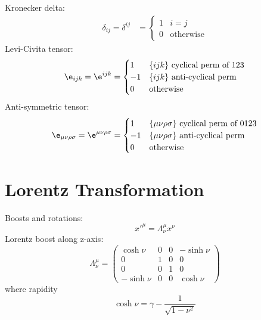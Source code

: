 \documentclass[a4paper, 11pt, normalem]{report}
\begin{document}
Kronecker delta:
\begin{align}
    \delta_{ij} = \delta^{ij} &= \begin{cases} 1 & i=j \\ 0 & \text{otherwise} \end{cases}
\end{align}
Levi-Civita tensor:
\begin{equation}
    \e_{ijk} = \e^{ijk} = \begin{cases} 1 & \{ijk\} \text{ cyclical perm of 123} \\ -1 & \{ijk\} \text{ anti-cyclical perm} \\ 0 & \text{otherwise} \end{cases}
\end{equation}
Anti-symmetric tensor:
\begin{equation}
    \e_{\mu\nu\rho\sigma} = \e^{\mu\nu\rho\sigma} = \begin{cases} 1 & \{\mu\nu\rho\sigma\} \text{ cyclical perm of 0123} \\ -1 & \{\mu\nu\rho\sigma\} \text{ anti-cyclical perm} \\ 0 & \text{otherwise} \end{cases}
\end{equation}

\section{Lorentz Transformation}
Boosts and rotations:
\begin{equation}
    x'^\mu = \Lambda^\mu_\nu x^\nu
\end{equation}
Lorentz boost along z-axis:
\begin{equation}
    \Lambda^\mu_\nu = \begin{pmatrix} \cosh\nu & 0 & 0 & -\sinh\nu \\ 0 & 1 & 0 & 0 \\ 0 & 0 & 1 & 0 \\ -\sinh\nu & 0 & 0 & \cosh\nu \end{pmatrix}
\end{equation}
where rapidity
\begin{equation}
    \cosh\nu = \gamma - \frac{1}{\sqrt{1-\nu^2}}
\end{equation}
\end{document}
